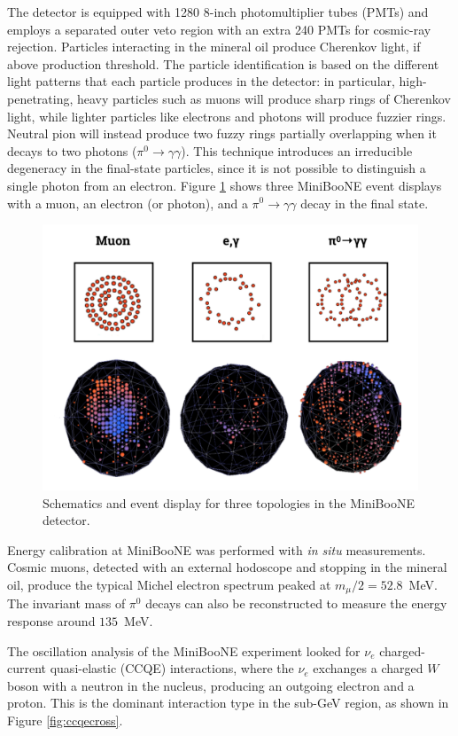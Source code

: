 The detector is equipped with 1280 8-inch photomultiplier tubes (PMTs) and employs a separated outer veto region with an extra 240 PMTs for cosmic-ray rejection. Particles interacting in the mineral oil produce Cherenkov light, if above production threshold. The particle identification is based on the different light patterns that each particle produces in the detector: in particular, high-penetrating, heavy particles such as muons will produce sharp rings of Cherenkov light, while lighter particles like electrons and photons will produce fuzzier rings. Neutral pion will instead produce two fuzzy rings partially overlapping when it decays to two photons ($\pi^{0}\rightarrow \gamma\gamma$). 
This technique introduces an irreducible degeneracy in the final-state particles, since it is not possible to distinguish a single photon from an electron. Figure \ref{fig:miniboone_evd} shows three MiniBooNE event displays with a muon, an electron (or photon), and a $\pi^0\rightarrow\gamma\gamma$ decay in the final state.

\begin{figure}[htbp]
    \centering
    \includegraphics[width=0.85\linewidth]{figures/miniboone_evd.png}
    \caption{Schematics and event display for three topologies in the MiniBooNE detector.}
    \label{fig:miniboone_evd}
\end{figure}

Energy calibration at MiniBooNE was performed with \emph{in situ} measurements. Cosmic muons, detected with an external hodoscope and stopping in the mineral oil, produce the typical Michel electron spectrum peaked at $m_{\mu}/2 = 52.8$~MeV. The invariant mass of $\pi^0$ decays can also be reconstructed to measure the energy response around $135$~MeV. 

The oscillation analysis of the MiniBooNE experiment looked for $\nu_e$ charged-current quasi-elastic (CCQE) interactions, where the $\nu_{e}$ exchanges a charged $W$ boson with a neutron in the nucleus, producing an outgoing electron and a proton. This is the dominant interaction type in the sub-GeV region, as shown in Figure \ref{fig:ccqecross}.

